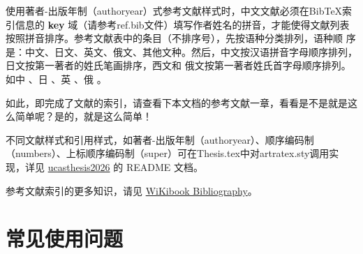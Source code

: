 使用著者-出版年制（authoryear）式参考文献样式时，中文文献必须在BibTeX索引信息的 \textbf{key} 域（请参考ref.bib文件）填写作者姓名的拼音，才能使得文献列表按照拼音排序。参考文献表中的条目（不排序号），先按语种分类排列，语种顺 序是：中文、日文、英文、俄文、其他文种。然后，中文按汉语拼音字母顺序排列，日文按第一著者的姓氏笔画排序，西文和 俄文按第一著者姓氏首字母顺序排列。如中 \citep{niu2013zonghe}、日 \citep{Bohan1928}、英 \citep{stamerjohanns2009mathml}、俄 \citep{Dubrovin1906}。

如此，即完成了文献的索引，请查看下本文档的参考文献一章，看看是不是就是这么简单呢？是的，就是这么简单！

不同文献样式和引用样式，如著者-出版年制（authoryear）、顺序编码制（numbers）、上标顺序编码制（super）可在Thesis.tex中对artratex.sty调用实现，详见 \href{https://github.com/wang2000star/ucasthesis2026}{ucasthesis2026} 的 README 文档。


参考文献索引的更多知识，请见 \href{https://en.wikibooks.org/wiki/LaTeX/Bibliography_Management}{WiKibook Bibliography}。\nocite{*}%

\section{常见使用问题}\label{sec:qa}

